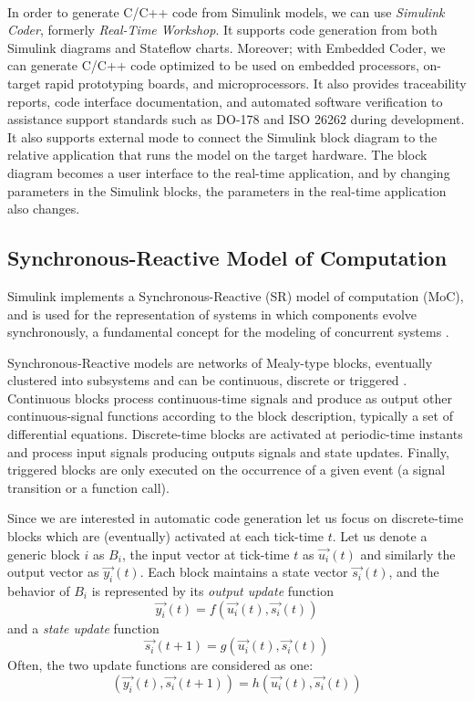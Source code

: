 \paragraph{} In order to generate C/C++ code from Simulink models, we can use \emph{Simulink Coder}\textregistered, formerly \emph{Real-Time Workshop}\textregistered. It supports code generation from both Simulink diagrams and Stateflow charts. Moreover; with Embedded Coder\textregistered, we can generate C/C++ code optimized to be used on embedded processors, on-target rapid prototyping boards, and microprocessors. It also provides traceability reports, code interface documentation, and automated software verification to assistance support standards such as DO-178 and ISO 26262 during development. It also supports external mode to connect the Simulink block diagram to the relative application that runs the model on the target hardware. The block diagram becomes a user interface to the real-time application, and by changing parameters in the Simulink blocks, the parameters in the real-time application also changes.

\subsection{Synchronous-Reactive Model of Computation}
Simulink implements a Synchronous-Reactive (SR) model of computation (MoC), and is used for the representation of systems in which components evolve synchronously, a fundamental concept for the modeling of concurrent systems \cite{Ptolemy2}. 
\par Synchronous-Reactive models are networks of Mealy-type blocks, eventually clustered into subsystems and can be continuous, discrete or triggered \cite{tres}. Continuous blocks process continuous-time signals and produce as output other continuous-signal functions according to the block description, typically a set of differential equations. Discrete-time blocks are activated at periodic-time instants and process input signals producing outputs signals and state updates. Finally, triggered blocks are only executed on the occurrence of a given event (a signal transition or a function call). 
\par Since we are interested in automatic code generation let us focus on discrete-time blocks which are (eventually) activated at each tick-time $t$. Let us denote a generic block $i$ as $B_i$, the input vector at tick-time $t$ as $\vec{u_i}(t)$ and similarly the output vector as $\vec{y_i}(t)$. Each block maintains a state vector $\vec{s_i}(t)$, and the behavior of $B_i$ is represented by its \emph{output update} function
\begin{equation}
\vec{y_i}(t)=f(\vec{u_i}(t),\vec{s_i}(t))
\end{equation}
and a \emph{state update} function
\begin{equation}
\vec{s_i}(t+1) = g(\vec{u_i}(t), \vec{s_i}(t))
\end{equation}
Often, the two update functions are considered as one:
\begin{equation}
(\vec{y_i}(t), \vec{s_i}(t+1)) = h(\vec{u_i}(t),\vec{s_i}(t))
\end{equation}

